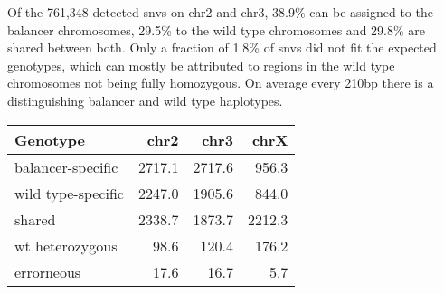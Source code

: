 Of the 761,348 detected \acp{snv} on \ac{chr2} and \ac{chr3}, 38.9\% can be
assigned to the balancer chromosomes, 29.5\% to the wild type chromosomes and
29.8\% are shared between both. Only a fraction of 1.8\% of \acp{snv} did not
fit the expected genotypes, which can mostly be attributed to regions in the
wild type chromosomes not being fully homozygous.
On average every 210bp there is a \snv distinguishing balancer and wild type
haplotypes.

\begin{table}[ht]
    \centering
    \begin{tabu}{lrrr}
        \toprule
        Genotype & \ac{chr2} & \ac{chr3} & \ac{chrX} \\
        \midrule
        balancer-specific  & 2717.1 & 2717.6 &  956.3 \\
        wild type-specific & 2247.0 & 1905.6 &  844.0 \\
        shared             & 2338.7 & 1873.7 & 2212.3 \\
        wt heterozygous    &   98.6 &  120.4 &  176.2 \\
        errorneous         &   17.6 &   16.7 &    5.7 \\
        \bottomrule
    \end{tabu}
\end{table}

